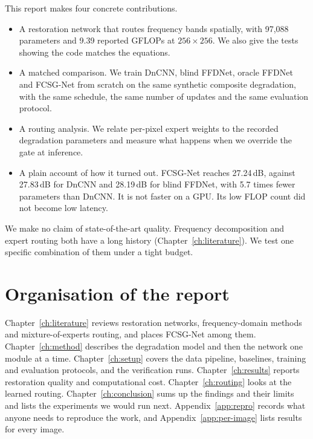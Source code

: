 \documentclass[12pt,a4paper,oneside]{NITR}
\newcommand{\fcsg}{FCSG-Net}
\newcommand{\dB}{\,dB}
\begin{document}
This report makes four concrete contributions.
\begin{itemize}
	\item A restoration network that routes frequency bands spatially, with
	97,088 parameters and 9.39 reported GFLOPs at $256\times256$. We also give
	the tests showing the code matches the equations.
	\item A matched comparison. We train DnCNN, blind FFDNet, oracle FFDNet and
	\fcsg{} from scratch on the same synthetic composite degradation, with the
	same schedule, the same number of updates and the same evaluation
	protocol.
	\item A routing analysis. We relate per-pixel expert weights to the
	recorded degradation parameters and measure what happens when we override
	the gate at inference.
	\item A plain account of how it turned out. \fcsg{} reaches 27.24\dB{},
	against 27.83\dB{} for DnCNN and 28.19\dB{} for blind FFDNet, with 5.7
	times fewer parameters than DnCNN. It is not faster on a GPU. Its low FLOP
	count did not become low latency.
\end{itemize}
We make no claim of state-of-the-art quality. Frequency decomposition and
expert routing both have a long history (Chapter~\ref{ch:literature}). We
test one specific combination of them under a tight budget.

\section{Organisation of the report}\label{sec:organisation}

Chapter~\ref{ch:literature} reviews restoration networks, frequency-domain
methods and mixture-of-experts routing, and places \fcsg{} among them.
Chapter~\ref{ch:method} describes the degradation model and then the network
one module at a time. Chapter~\ref{ch:setup} covers the data pipeline,
baselines, training and evaluation protocols, and the verification runs.
Chapter~\ref{ch:results} reports restoration quality and computational cost.
Chapter~\ref{ch:routing} looks at the learned routing.
Chapter~\ref{ch:conclusion} sums up the findings and their limits and lists
the experiments we would run next. Appendix~\ref{app:repro} records what
anyone needs to reproduce the work, and Appendix~\ref{app:per-image} lists
results for every image.

\thispagestyle{empty}\cleardoublepage
\end{document}
